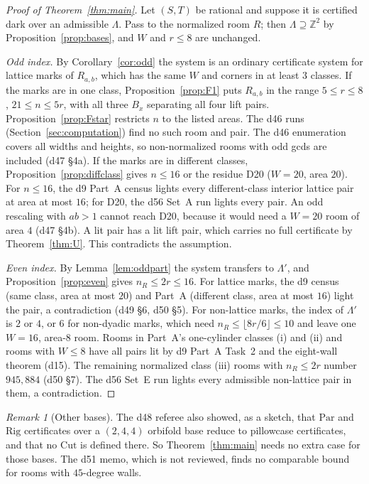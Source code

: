 \documentclass[11pt]{article}
\theoremstyle{definition}
\theoremstyle{remark}
\newtheorem{remark}{Remark}
\newcommand{\Z}{\mathbb Z}
\newcommand{\Par}{\mathrm{Par}}
\newcommand{\Rig}{\mathrm{Rig}}
\newcommand{\Cut}{\mathrm{Cut}}
\begin{document}
\begin{proof}[Proof of Theorem~\ref{thm:main}]
Let $(S,T)$ be rational and suppose it is certified dark over an admissible
$\Lambda$. Pass to the normalized room $R$; then $\Lambda\supseteq\Z^2$ by
Proposition~\ref{prop:bases}, and $W$ and $r\le 8$ are unchanged.

\emph{Odd index.} By Corollary~\ref{cor:odd} the system is an ordinary
certificate system for lattice marks of $R_{a,b}$, which has the same $W$ and
corners in at least $3$ classes. If the marks are in one class,
Proposition~\ref{prop:F1} puts $R_{a,b}$ in the range $5\le r\le 8$,
$21\le n\le 5r$, with all three $B_x$ separating all four lift pairs.
Proposition~\ref{prop:Fstar} restricts $n$ to the listed areas. The d46 runs
(Section~\ref{sec:computation}) find no such room and pair. The d46 enumeration
covers all widths and heights, so non-normalized rooms with odd gcds are
included (d47 \S4a). If the marks are in different classes,
Proposition~\ref{prop:diffclass} gives $n\le 16$ or the residue D20 ($W=20$,
area $20$). For $n\le 16$, the d9 Part~A census lights every different-class
interior lattice pair at area at most $16$; for D20, the d56 Set~A run lights
every pair. An odd rescaling with $ab>1$ cannot reach D20, because it would need
a $W=20$ room of area $4$ (d47 \S4b). A lit pair has a lit lift pair, which
carries no full certificate by Theorem~\ref{thm:U}. This contradicts the
assumption.

\emph{Even index.} By Lemma~\ref{lem:oddpart} the system transfers to
$\Lambda'$, and Proposition~\ref{prop:even} gives $n_R\le 2r\le 16$. For
lattice marks, the d9 census (same class, area at most $20$) and Part~A
(different class, area at most $16$) light the pair, a contradiction (d49
\S6, d50 \S5). For non-lattice marks, the index of $\Lambda'$ is $2$ or $4$, or
$6$ for non-dyadic marks, which need $n_R\le\lfloor 8r/6\rfloor\le 10$ and
leave one $W=16$, area-$8$ room. Rooms in Part~A's one-cylinder classes (i) and
(ii) and rooms with $W\le 8$ have all pairs lit by d9 Part~A Task~2 and the
eight-wall theorem (d15). The remaining normalized class (iii) rooms with
$n_R\le 2r$ number $945{,}884$ (d50 \S7). The d56 Set~E run lights every
admissible non-lattice pair in them, a contradiction.
\end{proof}

\begin{remark}[Other bases]
The d48 referee also showed, as a sketch, that $\Par$ and $\Rig$ certificates
over a $(2,4,4)$ orbifold base reduce to pillowcase certificates, and that no
$\Cut$ is defined there. So Theorem~\ref{thm:main} needs no extra case for
those bases. The d51 memo, which is not reviewed, finds no comparable bound for
rooms with $45$-degree walls.
\end{remark}
\end{document}
